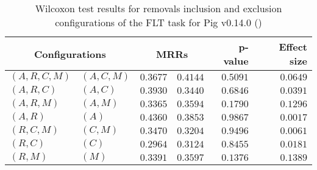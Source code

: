 
\begin{table}
\begin{spacing}{1.2}
\centering
\caption{Wilcoxon test results for removals inclusion and exclusion configurations of the FLT task for Pig v0.14.0 (\ctwo)}
\label{table:versus-wilcox-pig-flt-removals}
\begin{tabular}{ll|rr|rr}
\toprule
      \multicolumn{2}{c|}{Configurations} &                \multicolumn{2}{c|}{MRRs} &             p-value & Effect size \\
\midrule
 $(A,R,C,M)$ &  $(A,C,M)$ &       $0.3677$ &  $\bm{0.4144}$ & $0.5091$ &    $0.0649$ \\
   $(A,R,C)$ &    $(A,C)$ &  $\bm{0.3930}$ &       $0.3440$ & $0.6846$ &    $0.0391$ \\
   $(A,R,M)$ &    $(A,M)$ &       $0.3365$ &  $\bm{0.3594}$ & $0.1790$ &    $0.1296$ \\
     $(A,R)$ &      $(A)$ &  $\bm{0.4360}$ &       $0.3853$ & $0.9867$ &    $0.0017$ \\
   $(R,C,M)$ &    $(C,M)$ &  $\bm{0.3470}$ &       $0.3204$ & $0.9496$ &    $0.0061$ \\
     $(R,C)$ &      $(C)$ &       $0.2964$ &  $\bm{0.3124}$ & $0.8455$ &    $0.0181$ \\
     $(R,M)$ &      $(M)$ &       $0.3391$ &  $\bm{0.3597}$ & $0.1376$ &    $0.1389$ \\
\bottomrule
\end{tabular}

\end{spacing}
\end{table}

